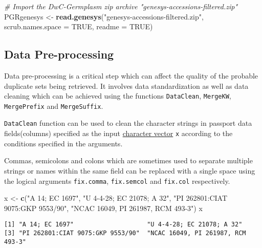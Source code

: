 \documentclass[
]{article}
\newenvironment{Shaded}{\begin{snugshade}}{\end{snugshade}}
\newcommand{\CommentTok}[1]{\textcolor[rgb]{0.56,0.35,0.01}{\textit{#1}}}
\newcommand{\DataTypeTok}[1]{\textcolor[rgb]{0.13,0.29,0.53}{#1}}
\newcommand{\KeywordTok}[1]{\textcolor[rgb]{0.13,0.29,0.53}{\textbf{#1}}}
\newcommand{\NormalTok}[1]{#1}
\newcommand{\OtherTok}[1]{\textcolor[rgb]{0.56,0.35,0.01}{#1}}
\newcommand{\StringTok}[1]{\textcolor[rgb]{0.31,0.60,0.02}{#1}}
\begin{document}
\begin{Shaded}
\begin{Highlighting}[]
\CommentTok{# Import the DwC-Germplasm zip archive "genesys-accessions-filtered.zip"}
\NormalTok{PGRgenesys <-}\StringTok{ }\KeywordTok{read.genesys}\NormalTok{(}\StringTok{"genesys-accessions-filtered.zip"}\NormalTok{,}
                           \DataTypeTok{scrub.names.space =} \OtherTok{TRUE}\NormalTok{, }\DataTypeTok{readme =} \OtherTok{TRUE}\NormalTok{)}
\end{Highlighting}
\end{Shaded}

\hypertarget{data-pre-processing}{%
\subsection{Data Pre-processing}\label{data-pre-processing}}

Data pre-processing is a critical step which can affect the quality of
the probable duplicate sets being retrieved. It involves data
standardization as well as data cleaning which can be achieved using the
functions \texttt{DataClean}, \texttt{MergeKW}, \texttt{MergePrefix} and
\texttt{MergeSuffix}.

\texttt{DataClean} function can be used to clean the character strings
in passport data fields(columns) specified as the input
\href{http://google.com/\#q=\%5BR\%5D+character+vector}{character
vector} \texttt{x} according to the conditions specified in the
arguments.

Commas, semicolons and colons which are sometimes used to separate
multiple strings or names within the same field can be replaced with a
single space using the logical arguments \texttt{fix.comma},
\texttt{fix.semcol} and \texttt{fix.col} respectively.

\begin{Shaded}
\begin{Highlighting}[]
\NormalTok{x <-}\StringTok{ }\KeywordTok{c}\NormalTok{(}\StringTok{"A 14; EC 1697"}\NormalTok{, }\StringTok{"U 4-4-28; EC 21078; A 32"}\NormalTok{, }\StringTok{"PI 262801:CIAT 9075:GKP 9553/90"}\NormalTok{,}
       \StringTok{"NCAC 16049, PI 261987, RCM 493-3"}\NormalTok{)}
\NormalTok{x}
\end{Highlighting}
\end{Shaded}

\begin{verbatim}
[1] "A 14; EC 1697"                    "U 4-4-28; EC 21078; A 32"        
[3] "PI 262801:CIAT 9075:GKP 9553/90"  "NCAC 16049, PI 261987, RCM 493-3"
\end{verbatim}
\end{document}
